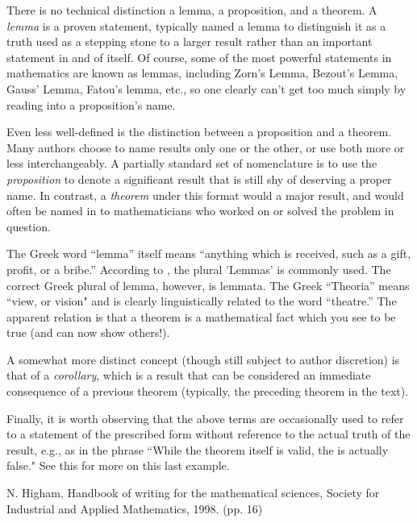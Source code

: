 \documentclass[12pt]{article}
\newcommand{\<}{\langle}
\renewcommand{\>}{\rangle}
\begin{document}

There is no technical distinction  a lemma, a proposition, and a theorem.  A \emph{lemma} is a proven statement, typically named a lemma to distinguish it as a truth used as a stepping stone to a larger result rather than an important statement in and of itself.  Of course, some of the most powerful statements in mathematics are known as lemmas, including Zorn's Lemma, Bezout's Lemma, Gauss' Lemma, Fatou's lemma, etc., so one clearly can't get too much simply by reading into a proposition's name.  

Even less well-defined is the distinction between a proposition and a theorem.  Many authors choose to name results only one or the other, or use both more or less interchangeably.  A partially standard set of nomenclature is to use the  \emph{proposition} to denote a significant result that is still shy of deserving a proper name.  In contrast, a \emph{theorem} under this format would  a major result, and would often be named in  to mathematicians who worked on or solved the problem in question.

The Greek word ``lemma'' itself means ``anything which is received, such as a gift, profit, or a bribe.''  According to \cite{Higham}, the plural 'Lemmas' is commonly used.  The correct Greek plural of lemma, however, is lemmata.  The Greek ``Theoria'' means ``view, or vision" and is clearly linguistically related to the word ``theatre.''  The apparent relation is that a theorem is a mathematical fact which you see to be true (and can now show others!).

A somewhat more distinct concept (though still subject to author discretion) is that of a \emph{corollary}, which is a result that can be considered an immediate consequence of a previous theorem (typically, the preceding theorem in the text).

Finally, it is worth observing that the above terms are occasionally used to refer to a statement of the prescribed form without reference to the actual truth of the result, e.g., as in the phrase ``While the theorem itself is valid, the  is actually false."  See this  for more on this last example.

\begin{thebibliography}{9}
 N. Higham, Handbook of writing for the mathematical sciences, Society for Industrial and Applied Mathematics, 1998.
(pp. 16)
\end{thebibliography}
\end{document}
